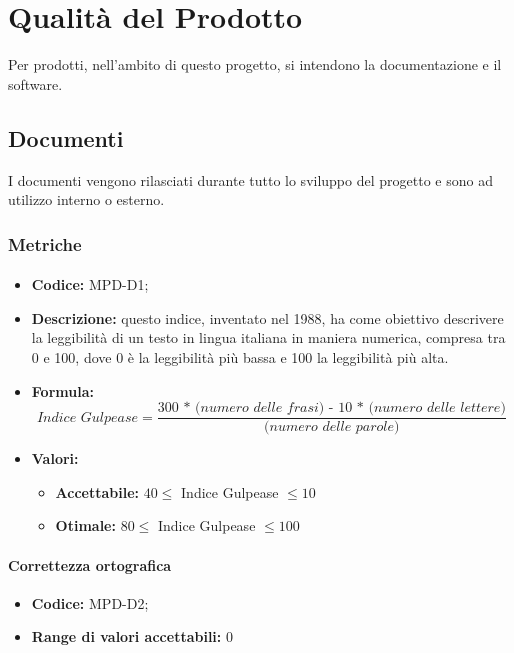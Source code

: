 \section{Qualità del Prodotto}
Per prodotti, nell'ambito di questo progetto, si intendono la documentazione e il software.

\subsection{Documenti}
I documenti vengono rilasciati durante tutto lo sviluppo del progetto e sono ad utilizzo interno o esterno.

\subsubsection{Metriche}

 
    \paragraph{}
\begin{itemize}
\item \textbf{Codice:} MPD-D1;
\item \textbf{Descrizione:} questo indice, inventato nel 1988, ha come obiettivo descrivere la leggibilità di un testo in lingua italiana in maniera numerica, compresa tra 0 e 100, dove 0 è la leggibilità più bassa e 100 la leggibilità più alta. 
\item \textbf{Formula:} \[\textit{Indice Gulpease} = \frac{\textit{300 * (numero delle frasi) - 10 * (numero delle lettere)}}{\textit{(numero delle parole)}}\]
\item \textbf{Valori:}
    \begin{itemize}
        \item \textbf{Accettabile:} $40 \leq$ Indice Gulpease $\leq 10$
        \item \textbf{Otimale:} $80 \leq$ Indice Gulpease $\leq 100$
    \end{itemize}

   
\end{itemize}

\paragraph{Correttezza ortografica}
\begin{itemize}
    \item \textbf{Codice:} MPD-D2;
    \item  \textbf{Range di valori accettabili:} 0
\end{itemize}

